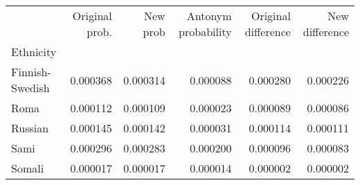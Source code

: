 \begin{tabular}{lrrrrr}
\toprule
{} &  Original prob. &  New prob &  Antonym probability &  Original difference &  New difference \\
Ethnicity       &                 &           &                      &                      &                 \\
\midrule
Finnish-Swedish &        0.000368 &  0.000314 &             0.000088 &             0.000280 &        0.000226 \\
Roma            &        0.000112 &  0.000109 &             0.000023 &             0.000089 &        0.000086 \\
Russian         &        0.000145 &  0.000142 &             0.000031 &             0.000114 &        0.000111 \\
Sami            &        0.000296 &  0.000283 &             0.000200 &             0.000096 &        0.000083 \\
Somali          &        0.000017 &  0.000017 &             0.000014 &             0.000002 &        0.000002 \\
\bottomrule
\end{tabular}
